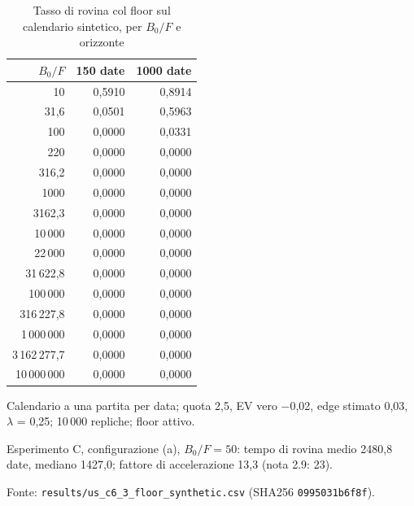 \begin{table}[htbp]
\centering
\small
\caption{Tasso di rovina col floor sul calendario sintetico, per $B_0/F$ e orizzonte}
\label{tab:floor_sintetico}
\begin{tabular}{rrr}
\toprule
$B_0/F$ & 150 date & 1000 date \\
\midrule
10 & 0,5910 & 0,8914 \\
31,6 & 0,0501 & 0,5963 \\
100 & 0,0000 & 0,0331 \\
220 & 0,0000 & 0,0000 \\
316,2 & 0,0000 & 0,0000 \\
1000 & 0,0000 & 0,0000 \\
3162,3 & 0,0000 & 0,0000 \\
10\,000 & 0,0000 & 0,0000 \\
22\,000 & 0,0000 & 0,0000 \\
31\,622,8 & 0,0000 & 0,0000 \\
100\,000 & 0,0000 & 0,0000 \\
316\,227,8 & 0,0000 & 0,0000 \\
1\,000\,000 & 0,0000 & 0,0000 \\
3\,162\,277,7 & 0,0000 & 0,0000 \\
10\,000\,000 & 0,0000 & 0,0000 \\
\bottomrule
\end{tabular}

\smallskip
\begin{minipage}{\linewidth}
\footnotesize
Calendario a una partita per data; quota 2,5, EV vero $-$0,02, edge stimato 0,03, $\lambda$ = 0,25; 10\,000 repliche; floor attivo.\par
Esperimento C, configurazione (a), $B_0/F = 50$: tempo di rovina medio 2480,8 date, mediano 1427,0; fattore di accelerazione 13,3 (nota 2.9: 23).\par
Fonte: \texttt{results/us\_c6\_3\_floor\_synthetic.csv} (SHA256 \texttt{0995031b6f8f}).
\end{minipage}
\end{table}
